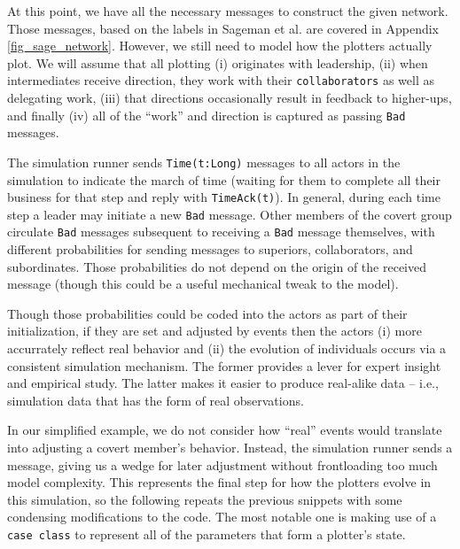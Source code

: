 \documentclass{article}
\newcommand{\Appref}[1]{Appendix \ref{fig_#1}}
\begin{document}
At this point, we have all the necessary messages to construct the given network.  Those messages, based on the labels in Sageman et al. are covered in \Appref{sage_network}.  However, we still need to model how the plotters actually plot.  We will assume that all plotting (i) originates with leadership, (ii) when intermediates receive direction, they work with their \texttt{collaborators} as well as delegating work, (iii) that directions occasionally result in feedback to higher-ups, and finally (iv) all of the ``work'' and direction is captured as passing \texttt{Bad} messages.

The simulation runner sends \texttt{Time(t:Long)} messages to all actors in the simulation to indicate the march of time (waiting for them to complete all their business for that step and reply with \texttt{TimeAck(t)}).  In general, during each time step a leader may initiate a new \texttt{Bad} message.  Other members of the covert group circulate \texttt{Bad} messages subsequent to receiving a \texttt{Bad} message themselves, with different probabilities for sending messages to superiors, collaborators, and subordinates.  Those probabilities do not depend on the origin of the received message (though this could be a useful mechanical tweak to the model).

Though those probabilities could be coded into the actors as part of their initialization, if they are set and adjusted by events then the actors (i) more accurrately reflect real behavior and (ii) the evolution of individuals occurs via a consistent simulation mechanism.  The former provides a lever for expert insight and empirical study.  The latter makes it easier to produce real-alike data -- i.e., simulation data that has the form of real observations.

In our simplified example, we do not consider how ``real'' events would translate into adjusting a covert member's behavior.  Instead, the simulation runner sends a message, giving us a wedge for later adjustment without frontloading too much model complexity.  This represents the final step for how the plotters evolve in this simulation, so the following repeats the previous snippets with some condensing modifications to the code.  The most notable one is making use of a \texttt{case class} to represent all of the parameters that form a plotter's state.
\end{document}
